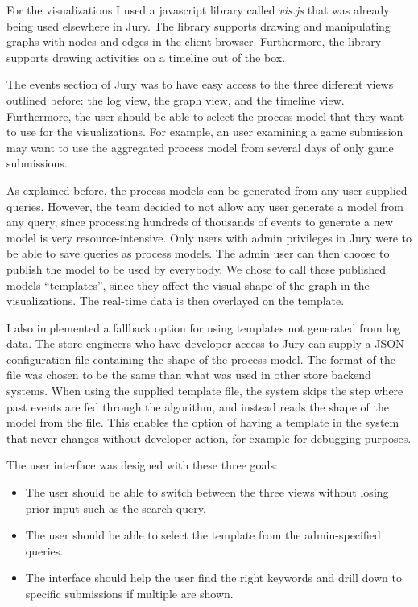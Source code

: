 For the visualizations I used a javascript library called \emph{vis.js}  that was already being used elsewhere in Jury.
The library supports drawing and manipulating graphs with nodes and edges in the client browser.
Furthermore, the library supports drawing activities on a timeline out of the box.


The events section of Jury was to have easy access to the three different views outlined before: the log view, the graph view, and the timeline view. Furthermore, the user should be able to select the process model that they want to use for the visualizations.
For example, an user examining a game submission may want to use the aggregated process model from several days of only game submissions.

As explained before, the process models can be generated from any user-supplied queries.
However, the team decided to not allow any user generate a model from any query, since processing hundreds of thousands of events to generate a new model is very resource-intensive.
Only users with admin privileges in Jury were to be able to save queries as process models.
The admin user can then choose to publish the model to be used by everybody.
We chose to call these published models ``templates'', since they affect the visual shape of the graph in the visualizations.
The real-time data is then overlayed on the template.

I also implemented a fallback option for using templates not generated from log data. The store engineers who have developer access to Jury can supply a JSON configuration file containing the shape of the process model. The format of the file was chosen to be the same than what was used in other store backend systems. 
When using the supplied template file, the system skips the step where past events are fed through the algorithm, and instead reads the shape of the model from the file.  
This enables the option of having a template in the system that never changes without developer action, for example for debugging purposes.

The user interface was designed with these three goals:
\begin{itemize}
    \item The user should be able to switch between the three views without losing prior input such as the search query.
    \item The user should be able to select the template from the admin-specified queries.
    \item The interface should help the user find the right keywords and drill down to specific submissions if multiple are shown.
\end{itemize}

